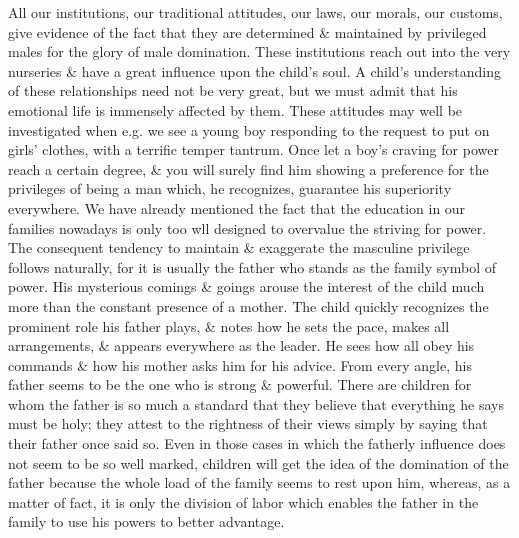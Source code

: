 \documentclass{article}
\begin{document}
All our institutions, our traditional attitudes, our laws, our morals, our customs, give evidence of the fact that they are determined \& maintained by privileged males for the glory of male domination. These institutions reach out into the very nurseries \& have a great influence upon the child's soul. A child's understanding of these relationships need not be very great, but we must admit that his emotional life is immensely affected by them. These attitudes may well be investigated when e.g. we see a young boy responding to the request to put on girls' clothes, with a terrific temper tantrum. Once let a boy's craving for power reach a certain degree, \& you will surely find him showing a preference for the privileges of being a man which, he recognizes, guarantee his superiority everywhere. We have already mentioned the fact that the education in our families nowadays is only too wll designed to overvalue the striving for power. The consequent tendency to maintain \& exaggerate the masculine privilege follows naturally, for it is usually the father who stands as the family symbol of power. His mysterious comings \& goings arouse the interest of the child much more than the constant presence of a mother. The child quickly recognizes the prominent role his father plays, \& notes how he sets the pace, makes all arrangements, \& appears everywhere as the leader. He sees how all obey his commands \& how his mother asks him for his advice. From every angle, his father seems to be the one who is strong \& powerful. There are children for whom the father is so much a standard that they believe that everything he says must be holy; they attest to the rightness of their views simply by saying that their father once said so. Even in those cases in which the fatherly influence does not seem to be so well marked, children will get the idea of the domination of the father because the whole load of the family seems to rest upon him, whereas, as a matter of fact, it is only the division of labor which enables the father in the family to use his powers to better advantage.
\end{document}
